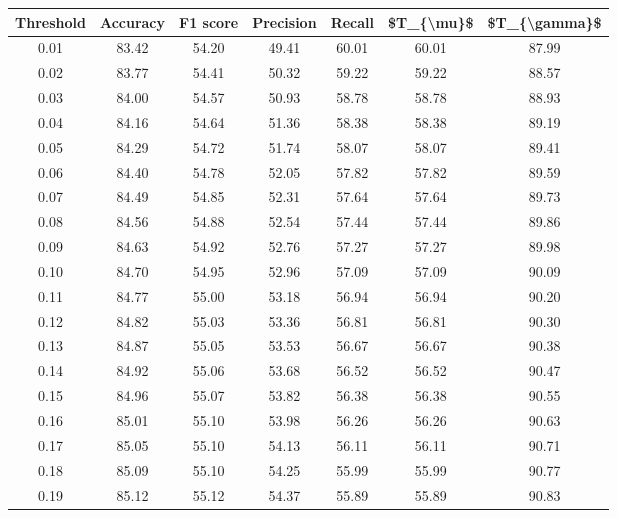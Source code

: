 \begin{tabular}{|c|c|c|c|c|c|c|}
\hline
 Threshold &  Accuracy &  F1 score &  Precision &  Recall &  \$T\_\{\textbackslash mu\}\$ &  \$T\_\{\textbackslash gamma\}\$ \\
\hline
      0.01 &     83.42 &     54.20 &      49.41 &   60.01 &      60.01 &         87.99 \\
      0.02 &     83.77 &     54.41 &      50.32 &   59.22 &      59.22 &         88.57 \\
      0.03 &     84.00 &     54.57 &      50.93 &   58.78 &      58.78 &         88.93 \\
      0.04 &     84.16 &     54.64 &      51.36 &   58.38 &      58.38 &         89.19 \\
      0.05 &     84.29 &     54.72 &      51.74 &   58.07 &      58.07 &         89.41 \\
      0.06 &     84.40 &     54.78 &      52.05 &   57.82 &      57.82 &         89.59 \\
      0.07 &     84.49 &     54.85 &      52.31 &   57.64 &      57.64 &         89.73 \\
      0.08 &     84.56 &     54.88 &      52.54 &   57.44 &      57.44 &         89.86 \\
      0.09 &     84.63 &     54.92 &      52.76 &   57.27 &      57.27 &         89.98 \\
      0.10 &     84.70 &     54.95 &      52.96 &   57.09 &      57.09 &         90.09 \\
      0.11 &     84.77 &     55.00 &      53.18 &   56.94 &      56.94 &         90.20 \\
      0.12 &     84.82 &     55.03 &      53.36 &   56.81 &      56.81 &         90.30 \\
      0.13 &     84.87 &     55.05 &      53.53 &   56.67 &      56.67 &         90.38 \\
      0.14 &     84.92 &     55.06 &      53.68 &   56.52 &      56.52 &         90.47 \\
      0.15 &     84.96 &     55.07 &      53.82 &   56.38 &      56.38 &         90.55 \\
      0.16 &     85.01 &     55.10 &      53.98 &   56.26 &      56.26 &         90.63 \\
      0.17 &     85.05 &     55.10 &      54.13 &   56.11 &      56.11 &         90.71 \\
      0.18 &     85.09 &     55.10 &      54.25 &   55.99 &      55.99 &         90.77 \\
      0.19 &     85.12 &     55.12 &      54.37 &   55.89 &      55.89 &         90.83 \\

\end{tabular}
